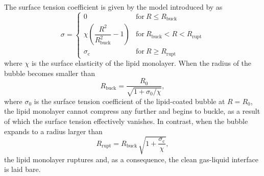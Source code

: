The surface tension coefficient is given by the model introduced by \citet{Marmottant2005} as
\begin{equation}
\sigma =
\begin{cases}
0 & \text{for} \ R \leq R_\text{buck} \\
\chi \left(\dfrac{R^2}{R_\text{buck}^2} - 1 \right) & \text{for} \ R_\text{buck} < R < R_\text{rupt} \\
\sigma_\text{c} & \text{for} \ R \geq R_\text{rupt}
\end{cases} \label{eq:sigma_marmottant}
\end{equation}
where $\chi$ is the surface elasticity of the lipid monolayer. When the radius of the bubble becomes smaller than \citep{Overvelde2010}
\begin{equation}
R_\text{buck} = \frac{R_0}{\sqrt{1 + \sigma_0/\chi}}, 
\label{eq:Rbuck}
\end{equation}
where $\sigma_0$ is the surface tension coefficient of the lipid-coated bubble at $R=R_0$, the lipid monolayer cannot compress any further and begins to buckle, as a result of which the surface tension effectively vanishes. In contrast, when the bubble expands to a radius larger than 
\begin{equation}
R_\text{rupt} = R_\text{buck} \, \sqrt{1+\frac{\sigma_\text{c}}{\chi}},
\label{eq:Rrupt}
\end{equation} 
the lipid monolayer ruptures and, as a consequence, the clean gas-liquid interface is laid bare. 


